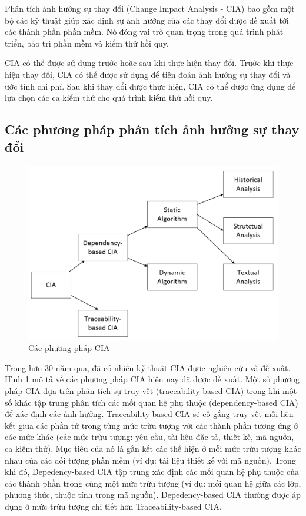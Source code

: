 \documentclass[12pt]{report}
\begin{document}
Phân tích ảnh hưởng sự thay đổi (Change Impact Analysis - CIA) bao gồm một bộ các kỹ thuật giúp xác định sự ảnh hưởng của các thay đổi được đề xuất tới các thành phần phần mềm. Nó đóng vai trò quan trọng trong quá trình phát triển, bảo trì phần mềm và kiểm thử hồi quy.

CIA có thể được sử dụng trước hoặc sau khi thực hiện thay đổi. Trước khi thực hiện thay đổi, CIA có thể được sử dụng để tiên đoán ảnh hưởng sự thay đổi và ước tính chi phí. Sau khi thay đổi được thực hiện, CIA có thể được ứng dụng để lựa chọn các ca kiểm thử cho quá trình kiểm thử hồi quy.

\subsection{Các phương pháp phân tích ảnh hưởng sự thay đổi}
\begin{figure}[h]
	\centering
	\includegraphics[scale=0.5]{CIA-hierarchy}
	\caption{Các phương pháp CIA}
	\label{fig:cia-hierarchy}
\end{figure}

Trong hơn 30 năm qua, đã có nhiều kỹ thuật CIA được nghiên cứu và đề xuất. Hình \ref{fig:cia-hierarchy} mô tả về các phương pháp CIA hiện nay đã được đề xuất. Một số phương pháp CIA dựa trên phân tích sự truy vết (traceability-based CIA) trong khi một số khác tập trung phân tích các mối quan hệ phụ thuộc (dependency-based CIA) để xác định các ảnh hưởng. Traceability-based CIA sẽ cố gắng truy vết mối liên kết giữa các phần tử trong từng mức trừu tượng với các thành phần tương ứng ở các mức khác (các mức trừu tượng: yêu cầu, tài liệu đặc tả, thiết kế, mã nguồn, ca kiểm thử). Mục tiêu của nó là gắn kết các thể hiện ở mỗi mức trừu tượng khác nhau của các đối tượng phần mềm (ví dụ: tài liệu thiết kế với mã nguồn). Trong khi đó, Depedency-based CIA tập trung xác định các mối quan hệ phụ thuộc của các thành phần trong cùng một mức trừu tượng (ví dụ: mối quan hệ giữa các lớp, phương thức, thuộc tính trong mã nguồn). Depedency-based CIA thường được áp dụng ở mức trừu tượng chi tiết hơn Traceability-based CIA.
\end{document}
